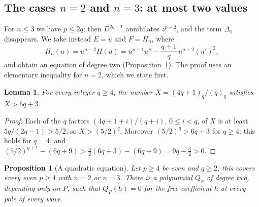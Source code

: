 \documentclass[11pt]{article}
\newtheorem{proposition}[theorem]{Proposition}
\newtheorem{lemma}[theorem]{Lemma}
\theoremstyle{definition}
\theoremstyle{remark}
\numberwithin{equation}{section}
\begin{document}
\subsection{\texorpdfstring{The cases \(n=2\) and \(n=3\): at most two values}{The cases n = 2 and n = 3: at most two values}}\label{sec:quadratic}

For \(n\le3\) we have \(p\le2q\); then \(D^{2q-1}\) annihilates
\(z^{p-2}\), and the term \(\Delta_1\) disappears. We take instead
\(E=u\) and \(F=H_n\), where
\[
 H_n(u)=u^{n-2}H(u)=u^{n-1}u''-\frac{q+1}{q}\,u^{n-2}(u')^2 ,
\]
and obtain an equation of degree two
(Proposition~\ref{prop:quadratic}). The proof uses an elementary
inequality for \(n=2\), which we state first.

\begin{lemma}\label{lem:kappa}
For every integer \(q\ge4\), the number \(X=(4q+1)_q/(q)_q\) satisfies
\(X>6q+3\).
\end{lemma}

\begin{proof}
Each of the \(q\) factors \((4q+1+i)/(q+i)\), \(0\le i<q\), of \(X\) is
at least \(5q/(2q-1)>5/2\), so \(X>(5/2)^q\). Moreover
\((5/2)^q>6q+3\) for \(q\ge4\): this holds for \(q=4\), and
\((5/2)^{q+1}-(6q+9)>\tfrac52(6q+3)-(6q+9)=9q-\tfrac32>0\).
\end{proof}

\begin{proposition}[A quadratic equation]\label{prop:quadratic}
Let \(p\ge4\) be even and \(q\ge2\); this covers every even \(p\ge4\)
with \(n=2\) or \(n=3\). There is a polynomial \(Q_P\) of degree two,
depending only on \(P\), such that \(Q_P(h)=0\) for the free
coefficient \(h\) at every pole of every wave.
\end{proposition}
\end{document}
